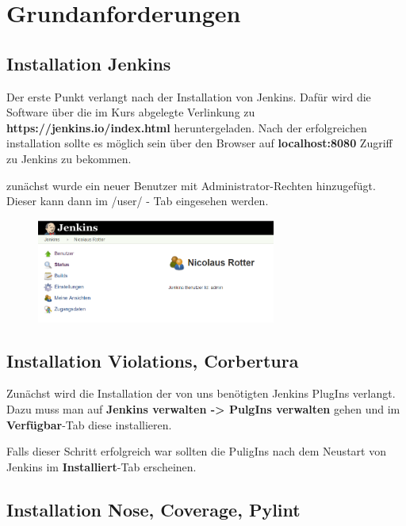 
\section{Grundanforderungen}
\label{sec:Ergebnisse}

\subsection{Installation Jenkins}

Der erste Punkt verlangt nach der Installation von Jenkins. Dafür wird die Software über die im Kurs abgelegte Verlinkung zu \textbf{https://jenkins.io/index.html} heruntergeladen. Nach der erfolgreichen installation sollte es möglich sein über den Browser auf \textbf{localhost:8080} Zugriff zu Jenkins zu bekommen. 

zunächst wurde ein neuer Benutzer mit Administrator-Rechten hinzugefügt. 
Dieser kann dann im /user/ - Tab eingesehen werden. 

\begin{figure}[!h]
	\begin{center}
		\includegraphics[width=0.7\textwidth]{images/userPNG.PNG}
	\end{center}
\end{figure}

\subsection{Installation Violations, Corbertura}

Zunächst wird die Installation der von uns benötigten Jenkins PlugIns verlangt. Dazu muss man auf \textbf{Jenkins verwalten -> PulgIns verwalten} gehen und im \textbf{Verfügbar}-Tab diese installieren. 

Falls dieser Schritt erfolgreich war sollten die PuligIns nach dem Neustart von Jenkins im \textbf{Installiert}-Tab erscheinen.

\subsection{Installation Nose, Coverage, Pylint}

